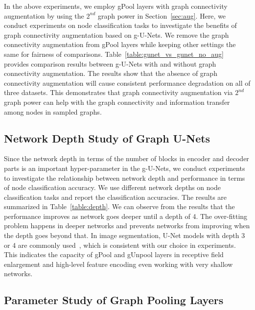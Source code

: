 \documentclass{article}
\begin{document}
In the above experiments, we employ gPool layers with graph connectivity
augmentation by using the $2^{nd}$ graph power in Section~\ref{sec:aug}. Here,
we conduct experiments on node classification tasks to investigate the
benefits of graph connectivity augmentation based on g-U-Nets. We remove the
graph connectivity augmentation from gPool layers while keeping other settings
the same for fairness of comparisons. Table~\ref{table:gunet_vs_gunet_no_aug}
provides comparison results between g-U-Nets with and without graph
connectivity augmentation. The results show that the absence of graph
connectivity augmentation will cause consistent performance degradation on all
of three datasets. This demonstrates that graph connectivity augmentation via
$2^{nd}$ graph power can help with the graph connectivity and information transfer
among nodes in sampled graphs.



\subsection{Network Depth Study of Graph U-Nets}\label{sec:exp_depth}

Since the network depth in terms of the number of blocks in encoder
and decoder parts is an important hyper-parameter in the g-U-Nets,
we conduct experiments to investigate the relationship between
network depth and performance in terms of node classification
accuracy. We use different network depths on node classification
tasks and report the classification accuracies. The results are
summarized in Table~\ref{table:depth}. We can observe from the
results that the performance improves as network goes deeper until a
depth of 4. The over-fitting problem happens in deeper networks and
prevents networks from improving when the depth goes beyond that. In
image segmentation, U-Net models with depth 3 or 4 are commonly
used~\citep{badrinarayanan2017segnet,cciccek20163d}, which is
consistent with our choice in experiments. This indicates the
capacity of gPool and gUnpool layers in receptive field enlargement
and high-level feature encoding even working with very shallow
networks.






\subsection{Parameter Study of Graph Pooling Layers}\label{sec:exp_param}
\end{document}
